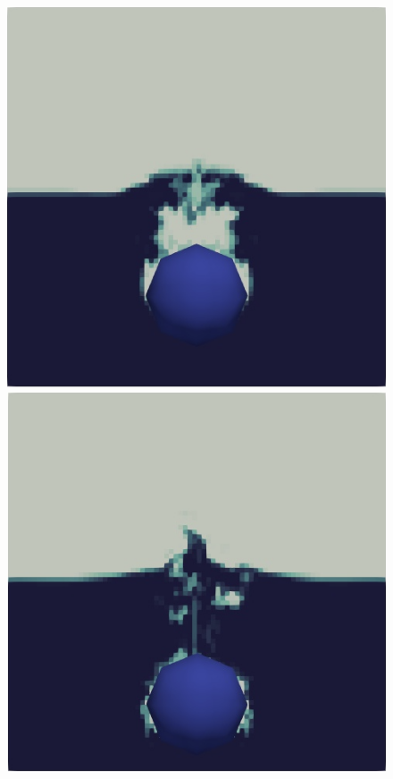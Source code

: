 \begin{figure}[H]
\begin{minipage}{.4\textwidth}
    \end{minipage}
    \newline
    \begin{minipage}{.4\textwidth}
        \centering
        \includegraphics[width=\linewidth]{GWU_Thesis_Sarmakeeva/Images/chap4/water_sphere/sphere_in_water04.png}
    \end{minipage}%
    \hspace{0.05\textwidth}
    \begin{minipage}{.4\textwidth}
        \centering
        \includegraphics[width=\linewidth]{GWU_Thesis_Sarmakeeva/Images/chap4/water_sphere/sphere_in_water07.png}

\end{minipage}
\end{figure}
